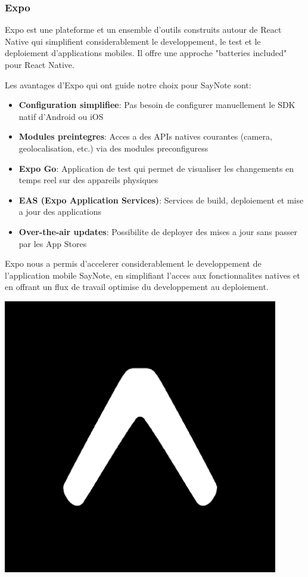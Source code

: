 \subsubsection{Expo}
\begin{minipage}{0.7\textwidth}
Expo est une plateforme et un ensemble d'outils construits autour de React Native qui simplifient considerablement le developpement, le test et le deploiement d'applications mobiles. Il offre une approche "batteries included" pour React Native.

Les avantages d'Expo qui ont guide notre choix pour SayNote sont:

\begin{itemize}
    \item \textbf{Configuration simplifiee}: Pas besoin de configurer manuellement le SDK natif d'Android ou iOS
    \item \textbf{Modules preintegres}: Acces a des APIs natives courantes (camera, geolocalisation, etc.) via des modules preconfiguress
    \item \textbf{Expo Go}: Application de test qui permet de visualiser les changements en temps reel sur des appareils physiques
    \item \textbf{EAS (Expo Application Services)}: Services de build, deploiement et mise a jour des applications
    \item \textbf{Over-the-air updates}: Possibilite de deployer des mises a jour sans passer par les App Stores
\end{itemize}

Expo nous a permis d'accelerer considerablement le developpement de l'application mobile SayNote, en simplifiant l'acces aux fonctionnalites natives et en offrant un flux de travail optimise du developpement au deploiement.
\end{minipage}%
\hfill
\begin{minipage}{0.25\textwidth}
\centering
\includegraphics[width=0.9\textwidth]{assets/docs/logo_expo.png}
\end{minipage}
